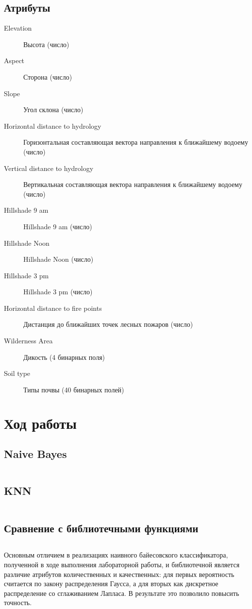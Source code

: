 \documentclass[12pt, a4paper] {article}
\begin{document}
\subsection{Атрибуты}
\begin{description}
  \item[Elevation] Высота (число)
  \item[Aspect] Сторона (число)
  \item[Slope] Угол склона (число)
  \item[Horizontal distance to hydrology] Горизонтальная составляющая вектора направления к ближайшему водоему (число)
  \item[Vertical distance to hydrology] Вертикальная составляющая вектора направления к ближайшему водоему (число)
  \item[Hillshade 9 am] Hillshade 9 am (число)
  \item[Hillshade Noon] Hillshade Noon (число)
  \item[Hillshade 3 pm] Hillshade 3 pm (число)
  \item[Horizontal distance to fire points] Дистанция до ближайших точек лесных пожаров (число)
  \item[Wilderness Area] Дикость (4 бинарных поля)
  \item[Soil type] Типы почвы (40 бинарных полей)
\end{description}

\section{Ход работы}
\subsection{Naive Bayes}
\inputminted{clojure}{bayes.clj}
\subsection{KNN}
\inputminted{clojure}{knn.clj}
\subsection{Сравнение с библиотечными функциями}
\inputminted{python}{listing.py}

Основным отличием в реализациях наивного байесовского классификатора, полученной в ходе
выполнения лабораторной работы, и библиотечной является различие атрибутов количественных и
качественных: для первых вероятность считается по закону распределения Гаусса, а для вторых
как дискретное распределение со сглаживанием Лапласа. В результате это позволило повысить точность.
\end{document}
